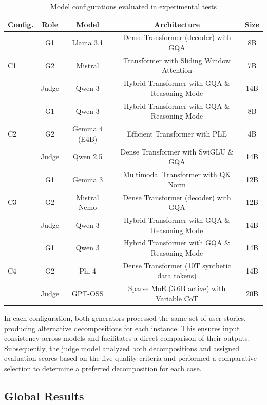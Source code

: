 \documentclass[pdflatex,sn-mathphys-num]{sn-jnl}
\theoremstyle{thmstyleone}%
\theoremstyle{thmstyletwo}%
\theoremstyle{thmstylethree}%
\begin{document}
\begin{table}[ht]
\centering
\caption{Model configurations evaluated in experimental tests}
\label{tab:model_configs}
\begin{tabular}{lcccc}
\toprule
Config. & Role & Model & Architecture & Size \\
\midrule
\multirow{3}{*}{C1}  
& G1 & Llama 3.1 & Dense Transformer (decoder) with GQA & 8B \\
& G2 & Mistral & Transformer with Sliding Window Attention & 7B \\
& Judge & Qwen 3 & Hybrid Transformer with GQA \& Reasoning Mode & 14B \\
\midrule
\multirow{3}{*}{C2}  
& G1 & Qwen 3 & Hybrid Transformer with GQA \& Reasoning Mode & 8B \\
& G2 & Gemma 4 (E4B) & Efficient Transformer with PLE & 4B \\
& Judge & Qwen 2.5 & Dense Transformer with SwiGLU \& GQA & 14B \\
\midrule
\multirow{3}{*}{C3}  
& G1 & Gemma 3 & Multimodal Transformer with QK Norm & 12B \\
& G2 & Mistral Nemo & Dense Transformer (decoder) with GQA & 12B \\
& Judge & Qwen 3 & Hybrid Transformer with GQA \& Reasoning Mode & 14B \\
\midrule
\multirow{3}{*}{C4}  
& G1 & Qwen 3 & Hybrid Transformer with GQA \& Reasoning Mode & 14B \\
& G2 & Phi-4 & Dense Transformer (10T synthetic data tokens) & 14B \\
& Judge & GPT-OSS & Sparse MoE (3.6B active) with Variable CoT & 20B \\
\bottomrule
\end{tabular}
\end{table}

In each configuration, both generators processed the same set of user stories, producing alternative decompositions for each instance. This ensures input consistency across models and facilitates a direct comparison of their outputs. Subsequently, the judge model analyzed both decompositions and assigned evaluation scores based on the five quality criteria and performed a comparative selection to determine a preferred decomposition for each case.

\subsection{Global Results}
\end{document}
